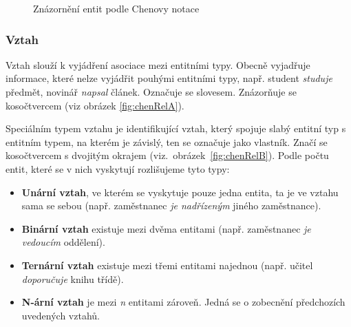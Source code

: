 \documentclass[czech,bachelor,public,dept460,male,oneside]{diploma}
\begin{document}
		\begin{figure}[H]
			\centering
			\caption[Znázornění entit podle Chenovy notace]{Znázornění entit podle Chenovy notace}
		\end{figure}

		\subsubsection{Vztah}
		Vztah slouží k vyjádření asociace mezi entitními typy. Obecně vyjadřuje informace, které nelze vyjádřit pouhými entitními typy, např. student \textit{studuje} předmět, novinář \textit{napsal} článek. Označuje se slovesem. Znázorňuje se kosočtvercem (viz obrázek \ref{fig:chenRelA}). 
		
		Speciálním typem vztahu je identifikující vztah, který spojuje slabý entitní typ s entitním typem, na kterém je závislý, ten se označuje jako vlastník. Značí se kosočtvercem s dvojitým okrajem (viz.~obrázek~\ref{fig:chenRelB}). Podle počtu entit, které se v nich vyskytují rozlišujeme tyto typy:
		
		\begin{itemize}
			\item \textbf{Unární vztah}, ve kterém se vyskytuje pouze jedna entita, ta je ve vztahu sama se sebou (např. zaměstnanec \textit{je nadřízeným} jiného zaměstnance).
			\item \textbf{Binární vztah} existuje mezi dvěma entitami (např. zaměstnanec \textit{je vedoucím} oddělení).
			\item \textbf{Ternární vztah} existuje mezi třemi entitami najednou (např. učitel \textit{doporučuje} knihu třídě).
			\item \textbf{N-ární vztah} je mezi \textit{n} entitami zároveň. Jedná se o zobecnění předchozích uvedených vztahů.
		\end{itemize}
		
\end{document}
